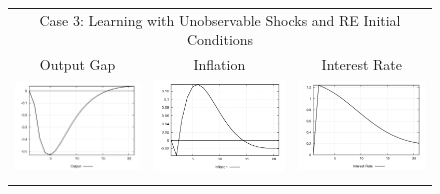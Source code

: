 \begin{figure}
\begin{tabular}{ccc}
\multicolumn{3}{c}{Case 3: Learning with Unobservable Shocks and RE Initial Conditions}\\
Output Gap & Inflation & Interest Rate \\ 
\includegraphics[scale=0.28]{results_reinit/Output_mpshock_irf.png} & 
\includegraphics[scale=0.28]{results_reinit/Inflation_mpshock_irf.png} & 
\includegraphics[scale=0.28]{results_reinit/Interest_Rate_mpshock_irf.png} \\ \\ 

\end{tabular}
\end{figure}
